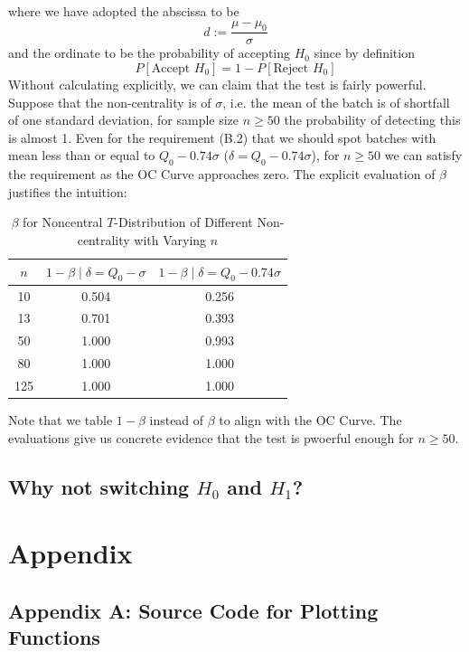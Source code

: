 \documentclass[12pt]{article}
\begin{document}
\noindent where we have adopted the abscissa to be
$$
d := \dfrac{\mu - \mu_0}{\sigma}
$$
and the ordinate to be the probability of accepting $H_0$ since by definition
$$
P[\text{Accept } H_0] = 1 - P[\text{Reject }H_0]
$$
Without calculating explicitly, we can claim that the test is fairly powerful. Suppose that the non-centrality is of $\sigma$, i.e. the mean of the batch is of shortfall of one standard deviation, for sample size $n\geq 50$ the probability of detecting this is almost 1. Even for the requirement (B.2) that we should spot batches with mean less than or equal to $Q_0 - 0.74\sigma$ ($\delta = Q_0 - 0.74\sigma$), for $n\geq 50$ we can satisfy the requirement as the OC Curve approaches zero. The explicit evaluation of $\beta$ justifies the intuition:

\begin{table}[htbp]
    \centering
    \begin{tabular}{ccc}
        \toprule
        $n$ & $1-\beta\mid\delta = Q_0 - \sigma$ & $1-\beta\mid\delta = Q_0 - 0.74\sigma$ \\
        \midrule
        10 & 0.504 & 0.256 \\
        13 & 0.701 & 0.393 \\
        50 & 1.000 & 0.993 \\
        80 & 1.000 & 1.000 \\
        125 & 1.000 & 1.000 \\
        \bottomrule
    \end{tabular}
    \caption{$\beta$ for Noncentral $T$-Distribution of Different Non-centrality with Varying $n$}
\end{table}

\noindent Note that we table $1-\beta$ instead of $\beta$ to align with the OC Curve. The evaluations give us concrete evidence that the test is pwoerful enough for $n\geq 50$.

\subsection{Why not switching $H_0$ and $H_1$?}

\newpage
\section{Appendix}

\subsection{Appendix A: Source Code for Plotting Functions}
\label{mmacode}
\end{document}
